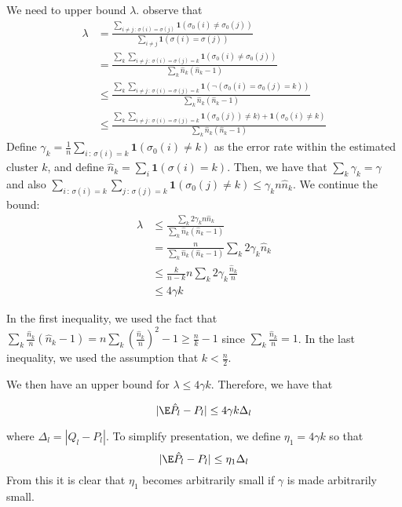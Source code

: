 \documentclass{article}
\begin{document}
We need to upper bound $\lambda$. observe that
\begin{align*}
\lambda 
  &= \frac{\sum_{i \neq j \,:\, \sigma(i) = \sigma(j) }\mathbf{1}(\sigma_0(i) \neq \sigma_0(j)) }{\sum_{i\neq j} \mathbf{1}(\sigma(i) = \sigma(j)) } 
      \\
  &= 
   \frac{\sum_k \sum_{i \neq j \,:\, \sigma(i)=\sigma(j)=k} \mathbf{1}(\sigma_0(i) \neq \sigma_0(j))}{\sum_k \hat{n}_k (\hat{n}_k-1)} 
      \\
  &\leq \frac{\sum_k \sum_{i \neq j \,:\, \sigma(i)=\sigma(j)=k} 
       \mathbf{1}( \neg (\sigma_0(i) = \sigma_0(j) =k) )}{\sum_k \hat{n}_k (\hat{n}_k-1)} 
      \\ 
  &\leq \frac{ \sum_k \sum_{i \neq j \,:\, \sigma(i)=\sigma(j)=k} \mathbf{1}(\sigma_0(j)) \neq k) + \mathbf{1}(\sigma_0(i) \neq k)}
            {\sum_k \hat{n}_k (\hat{n}_k - 1)} 
\end{align*}
Define $\gamma_k = \frac{1}{n} \sum_{i \,:\, \sigma(i)=k} \mathbf{1}(\sigma_0(i) \neq k)$ as the error rate within the estimated cluster $k$, and define $\hat{n}_k = \sum_i \mathbf{1}(\sigma(i) = k)$. Then, we have that $\sum_k \gamma_k = \gamma$ and also $\sum_{i \,:\, \sigma(i) = k} \sum_{j \,:\, \sigma(j) = k} \mathbf{1}(\sigma_0(j) \neq k) \leq \gamma_k n \hat{n}_k$. We continue the bound: 
\begin{align*}
\lambda  
  &\leq \frac{ \sum_k 2 \gamma_k n \hat{n}_k }{\sum_k \hat{n}_k(\hat{n}_k - 1)} 
     \\
  &= \frac{n}{\sum_k \hat{n}_k (\hat{n}_k - 1) } \sum_k 2 \gamma_k \hat{n}_k 
     \\
  &\leq \frac{k}{n-k} n \sum_k 2 \gamma_k \frac{\hat{n}_k}{n} \\
  &\leq 4 \gamma k
\end{align*}

In the first inequality, we used the fact that $\sum_k \frac{\hat{n}_k }{n} (\hat{n}_k - 1) = n \sum_k \left( \frac{\hat{n}_k}{n} \right)^2 - 1 \geq \frac{n}{k} - 1$ since $\sum_k \frac{\hat{n}_k}{n} = 1$. In the last inequality, we used the assumption that $k < \frac{n}{2}$. 

We then have an upper bound for $\lambda \leq 4 \gamma k$. Therefore, we have that

\[
|\E \hat{P}_l - P_l | \leq 4 \gamma k \Delta_l
\]

where $\Delta_l  = |Q_l - P_l|$. To simplify presentation, we define $\eta_1 = 4 \gamma k$ so that
\[
|\E \hat{P}_l - P_l | \leq \eta_1 \Delta_l
\]
From this it is clear that $\eta_1$ becomes arbitrarily small if $\gamma$ is made arbitrarily small. 
\end{document}
